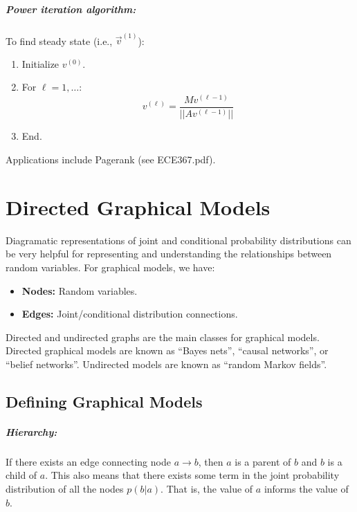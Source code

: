 \documentclass[a4paper,12pt]{report}
\begin{document}
\paragraph{Power iteration algorithm: } To find steady state (i.e., $\vec v^{(1)}$): 

\begin{enumerate}
\item Initialize $v^{(0)}$.
\item For $\ell = 1, \dots$:
\begin{equation}
v^{(\ell)} = \frac{Mv^{(\ell-1)}}{||Av^{(\ell-1)}||} 
\end{equation}
\item End.
\end{enumerate}

Applications include Pagerank (see ECE367.pdf).




\chapter{Directed Graphical Models}

Diagramatic representations of joint and conditional probability distributions can be very helpful for representing and understanding the relationships between random variables. For graphical models, we have:
\begin{itemize}
\item \textbf{Nodes:} Random variables.
\item \textbf{Edges:} Joint/conditional distribution connections.
\end{itemize}

Directed and undirected graphs are the main classes for graphical models. Directed graphical models are known as ``Bayes nets'', ``causal networks'', or ``belief networks''. Undirected models are known as ``random Markov fields''.


\section{Defining Graphical Models}

\paragraph{Hierarchy: } If there exists an edge connecting node $a\to b$, then $a$ is a parent of $b$ and $b$ is a child of $a$. This also means that there exists some term in the joint probability distribution of all the nodes $p(b|a)$. That is, the value of $a$ informs the value of $b$.
\end{document}
